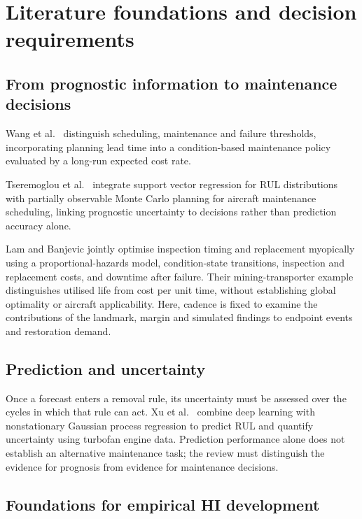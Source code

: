 \documentclass[preprint,12pt]{elsarticle}
\begin{document}
\section{Literature foundations and decision requirements}\label{sec:related}


\subsection{From prognostic information to maintenance decisions}

Wang et al.\ \cite{Wang2015} distinguish scheduling, maintenance and failure thresholds, incorporating planning lead time into a condition-based maintenance policy evaluated by a long-run expected cost rate.

Tseremoglou et al.\ \cite{Tseremoglou2022} integrate support vector regression for RUL distributions with partially observable Monte Carlo planning for aircraft maintenance scheduling, linking prognostic uncertainty to decisions rather than prediction accuracy alone.

Lam and Banjevic \cite{LamBanjevic2015} jointly optimise inspection timing and replacement myopically using a proportional-hazards model, condition-state transitions, inspection and replacement costs, and downtime after failure. Their mining-transporter example distinguishes utilised life from cost per unit time, without establishing global optimality or aircraft applicability. Here, cadence is fixed to examine the contributions of the landmark, margin and simulated findings to endpoint events and restoration demand.

\subsection{Prediction and uncertainty}

Once a forecast enters a removal rule, its uncertainty must be assessed over the cycles in which that rule can act. Xu et al.\ \cite{Xu2022} combine deep learning with nonstationary Gaussian process regression to predict RUL and quantify uncertainty using turbofan engine data. Prediction performance alone does not establish an alternative maintenance task; the review must distinguish the evidence for prognosis from evidence for maintenance decisions.

\subsection{Foundations for empirical HI development}
\end{document}
